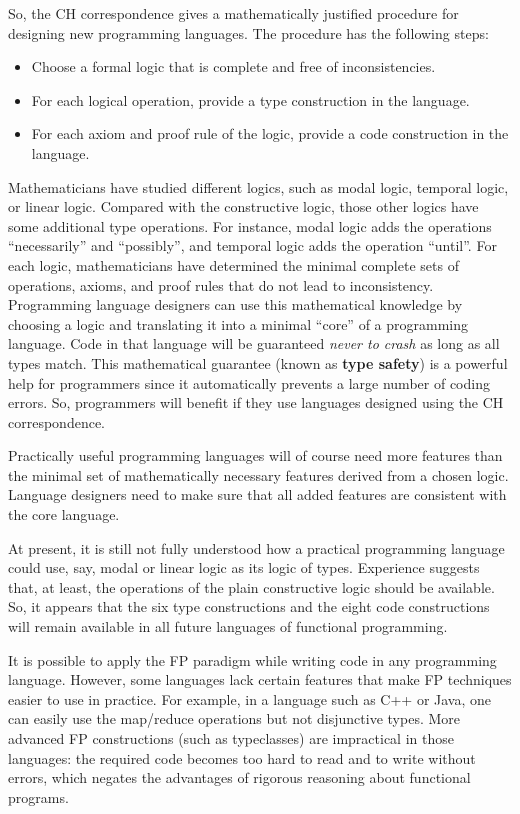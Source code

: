 So, the CH correspondence gives a mathematically justified procedure
for designing new programming languages. The procedure has the following
steps:
\begin{itemize}
\item Choose a formal logic that is complete and free of inconsistencies.
\item For each logical operation, provide a type construction in the language.
\item For each axiom and proof rule of the logic, provide a code construction
in the language.
\end{itemize}
Mathematicians have studied different logics, such as modal logic,
temporal logic, or linear logic. Compared with the constructive logic,
those other logics have some additional type operations. For instance,
modal logic adds the operations \textsf{``}necessarily\textsf{''} and \textsf{``}possibly\textsf{''},
and temporal logic adds the operation \textsf{``}until\textsf{''}. For each logic,
mathematicians have determined the minimal complete sets of operations,
axioms, and proof rules that do not lead to inconsistency. Programming
language designers can use this mathematical knowledge by choosing
a logic and translating it into a minimal \textsf{``}core\textsf{''} of a programming
language. Code in that language will be guaranteed \emph{never to
crash} as long as all types match. This mathematical guarantee (known
as \textbf{type safety}) is a powerful help for
programmers since it automatically prevents a large number of coding
errors. So, programmers will benefit if they use languages designed
using the CH correspondence.

Practically useful programming languages will of course need more
features than the minimal set of mathematically necessary features
derived from a chosen logic. Language designers need to make sure
that all added features are consistent with the core language. 

At present, it is still not fully understood how a practical programming
language could use, say, modal or linear logic as its logic of types.
Experience suggests that, at least, the operations of the plain constructive
logic should be available. So, it appears that the six type constructions
and the eight code constructions will remain available in all future
languages of functional programming. 

It is possible to apply the FP paradigm while writing code in any
programming language. However, some languages lack certain features
that make FP techniques easier to use in practice. For example, in
a language such as C++ or Java, one can easily use the map/reduce
operations but not disjunctive types. More advanced FP constructions
(such as typeclasses) are impractical in those languages: the required
code becomes too hard to read and to write without errors, which negates
the advantages of rigorous reasoning about functional programs.


